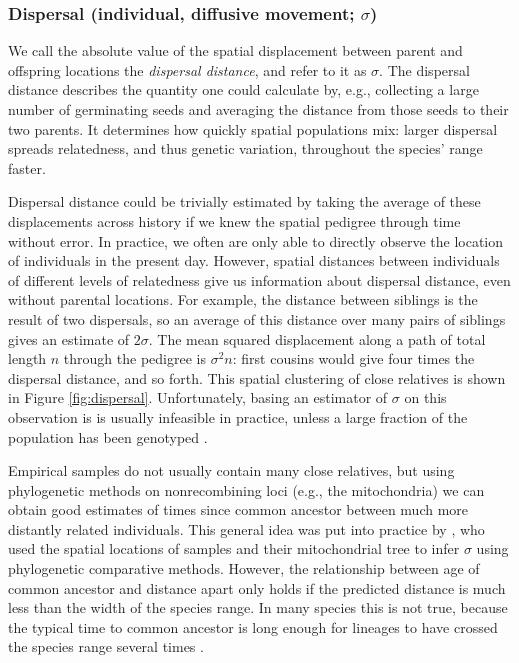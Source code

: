 \documentclass{ar-1col}
\renewcommand{\emph}[1]{{\textit{#1}}}
\begin{document}
\subsubsection{Dispersal (individual, diffusive movement; $\sigma$)}

We call the absolute value of the spatial displacement between parent and offspring locations
the \emph{dispersal distance}, and refer to it as $\sigma$.
The dispersal distance describes the quantity one could calculate by,
e.g., collecting a large number of germinating seeds
and averaging the distance from those seeds to their two parents.
It determines how quickly spatial populations mix:
larger dispersal spreads relatedness, and thus genetic variation,
throughout the species' range faster.

Dispersal distance could be trivially estimated by taking
the average of these displacements across history
if we knew the spatial pedigree through time without error.
In practice, we often are only able to directly observe
the location of individuals in the present day.
However, 
spatial distances between individuals of different levels of relatedness
give us information about dispersal distance, even without parental locations.
For example,
the distance between siblings is the result of two dispersals,
so an average of this distance over many pairs of siblings 
gives an estimate of $2 \sigma$.
The mean squared displacement along
a path of total length $n$ through the pedigree is $\sigma^2 n$:
first cousins would give four times the dispersal distance, and so forth.
This spatial clustering of close relatives
is shown in Figure \ref{fig:dispersal}.
Unfortunately, basing an estimator of $\sigma$ on this observation
is is usually infeasible in practice,
unless a large fraction of the population has been genotyped
\citep[e.g.,][]{Aguillon2017deconstructing}.

Empirical samples do not usually contain many close relatives,
but using phylogenetic methods on nonrecombining loci (e.g., the mitochondria)
we can obtain good estimates of times since common ancestor
between much more distantly related individuals.
This general idea was put into practice by \citet{neigel1993application}, %
who used the spatial locations of samples and their mitochondrial tree 
to infer $\sigma$ using phylogenetic comparative methods.
However, the relationship between age of common ancestor and distance apart
only holds if the predicted distance is much less than the width of the species range.
In many species this is not true,
because the typical time to common ancestor is long enough 
for lineages to have crossed the species range several times \citet{barton1995genealogies}.
\end{document}
